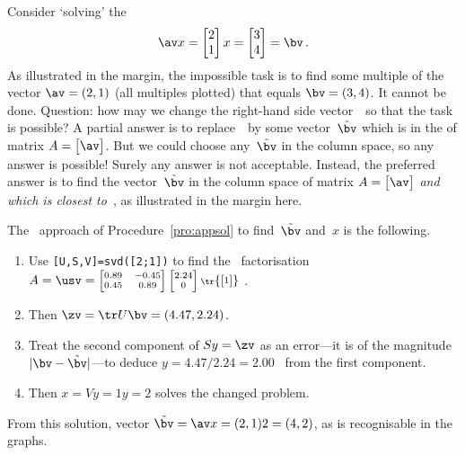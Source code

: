 \begin{example} \label{eg:incon1}
Consider `solving' the  
\begin{equation*}
\av x=\begin{bmatrix} 2\\1 \end{bmatrix}x=\begin{bmatrix} 3\\4 \end{bmatrix}=\bv\,.
\end{equation*}
As illustrated in the margin, the impossible task is to find some multiple of the vector \(\av=(2,1)\) (all multiples plotted) that equals \(\bv=(3,4)\).
It cannot be done.
%
Question: how may we change the right-hand side vector~\bv\ so that the task is possible?  
A partial answer is to replace~\bv\ by some vector~\(\tilde\bv\) which is in the  of matrix \(A=\begin{bmatrix} \av \end{bmatrix}\).
But we could choose any~\(\tilde\bv\) in the column space, so any answer is possible! Surely any answer is not acceptable.
Instead, the preferred answer is to find the vector~\(\tilde\bv\) in the column space of matrix \(A=\begin{bmatrix} \av \end{bmatrix}\) \emph{and which is closest to}~\bv, as illustrated in the margin here.
%

The \svd\ approach of Procedure~\ref{pro:appsol} to find~\(\tilde\bv\) and~\(x\) is the following.
\begin{enumerate}
\item Use \verb|[U,S,V]=svd([2;1])| to find the \svd\ factorisation \(A=\usv=\scriptsize\begin{bmatrix} 0.89&-0.45\\0.45&0.89 \end{bmatrix} \begin{bmatrix} 2.24\\0 \end{bmatrix}\tr{\begin{bmatrix} 1 \end{bmatrix}}\) \twodp.
\item Then \(\zv=\tr U\bv=(4.47,2.24)\).
\item Treat the second component of \(Sy=\zv\) as an error---it is of the magnitude \(|\bv-\tilde\bv|\)---to deduce \(y=4.47/2.24=2.00\) \twodp\ from the first component.
\item Then  \(x=Vy=1y=2\) solves the changed problem.
\end{enumerate}
From this solution, vector \(\tilde\bv=\av x=(2,1)2=(4,2)\), as is recognisable in the graphs.
\end{example}

